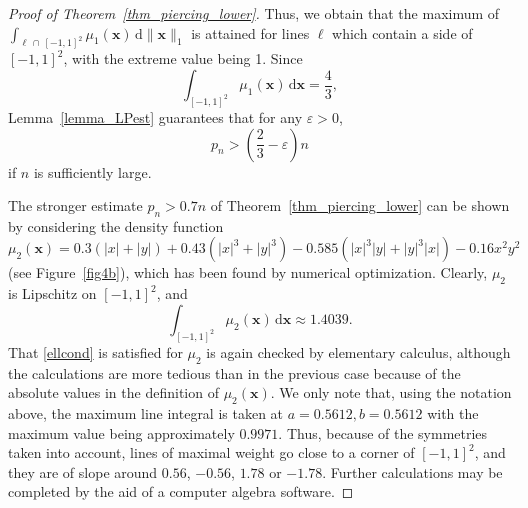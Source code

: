 \documentclass[11pt,a4paper]{amsart}
\newcommand{\eps}{\varepsilon}
\newcommand{\dd}{\,\mathrm{d}}
\newcommand{\x}{\mathbf{x}}
\begin{document}
\begin{proof}[Proof of Theorem~\ref{thm_piercing_lower}]
Thus, we obtain that the maximum of $  \int_{\ell \,\cap\, [-1,1]^2} \mu_1(\x) \dd \|\x\|_1 $ is attained for lines $\ell$ which contain a side of $[-1,1]^2$, with the extreme value being 1.  Since
 \[
\int_{[-1,1]^2}  \mu_1 (\x) \dd \x = \frac 4 3,
\]
 Lemma~\ref{lemma_LPest} guarantees that for any $\eps>0$,
\[
p_n > \left( \frac 2 3 - \eps \right) n
\]
if $n$ is sufficiently large.

The stronger estimate $p_n > 0.7 n$ of Theorem~\ref{thm_piercing_lower} can be shown by considering the density function
\begin{equation*}
\mu_2(\x) = 0.3 (|x| + |y|) + 0.43 (|x|^3 + |y|^3) - 0.585 (|x|^3 |y| + |y|^3 |x|) - 0.16 x^2 y^2
\end{equation*}
(see Figure~\ref{fig4b}), which has been found by numerical optimization. Clearly, $\mu_2$ is Lipschitz on $[-1,1]^2$, and
\[
\int_{[-1,1]^2} \mu_2(\x) \dd \x \approx 1.4039.
\]
That \eqref{ellcond} is satisfied for $\mu_2$ is again checked by elementary calculus, although the calculations are more tedious than in the previous case because of the absolute values in the definition of $\mu_2(\x)$. We only note that, using the notation above,  the maximum line integral is taken at $a=0.5612, b=0.5612$ with the maximum value being approximately $0.9971$. Thus, because of the symmetries taken into account, lines of maximal weight go close to a corner of $[-1,1]^2$, and they are of slope around $0.56$, $-0.56$, $1.78$ or $-1.78$. Further calculations may be completed by the aid of a computer algebra software.
\end{proof}
\end{document}
